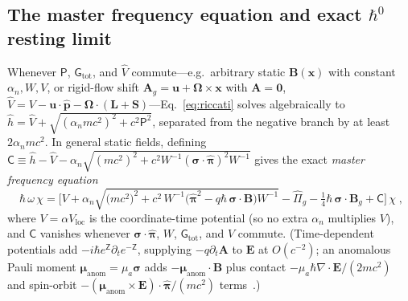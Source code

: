 \documentclass[aps,prd,onecolumn,tightenlines,nofootinbib,notitlepage,10pt,floatfix]{revtex4-2}
\theoremstyle{indentedtheorem}
\begin{document}
\subsection{The master frequency equation and exact \texorpdfstring{$\hbar^0$}{hbar0} resting limit}
\label{sec:master_equation_sub}

Whenever $\mathsf{P}$, $\mathsf{G}_\text{tot}$, and $\hat{V}$ commute---e.g.\ arbitrary static $\mathbf{B}(\mathbf{x})$ with constant $\alpha_n,W,V$, or rigid-flow shift $\mathbf{A}_g=\mathbf{u}+\boldsymbol{\Omega}\times\mathbf{x}$ with $\mathbf{A}=\mathbf{0}$, $\hat{V}=V-\mathbf{u}\cdot\hat{\mathbf{p}}-\boldsymbol{\Omega}\cdot(\mathbf{L}+\mathbf{S})$---Eq.~\eqref{eq:riccati} solves algebraically to $\hat{h}=\hat{V}+\sqrt{(\alpha_n mc^2)^2+c^2\mathsf{P}^2}$, separated from the negative branch by at least $2\alpha_n mc^2$. In general static fields, defining $\mathsf{C}\equiv\hat{h}-\hat{V}-\alpha_n\sqrt{(mc^2)^2+c^2 W^{-1}(\boldsymbol{\sigma}\cdot\hat{\boldsymbol{\pi}})^2 W^{-1}}$ gives the exact \emph{master frequency equation}
\begin{equation}
    \boxed{\;
    \hbar\,\omega\,\chi = \Big[V + \alpha_n\sqrt{\big(mc^2\big)^2 + c^2\,W^{-1}\big(\hat{\boldsymbol{\pi}}^2 - q\hbar\,\boldsymbol{\sigma}\cdot\mathbf{B}\big)W^{-1}} - \hat{\Pi}_g - \tfrac{1}{4}\hbar\,\boldsymbol{\sigma}\cdot\mathbf{B}_g + \mathsf{C}\Big]\,\chi\;} ,
    \label{eq:master}
\end{equation}
where $V=\alpha V_\text{loc}$ is the coordinate-time potential (so no extra $\alpha_n$ multiplies $V$), and $\mathsf{C}$ vanishes whenever $\boldsymbol{\sigma}\cdot\hat{\boldsymbol{\pi}}$, $W$, $\mathsf{G}_\text{tot}$, and $\hat{V}$ commute. (Time-dependent potentials add $-i\hbar e^{\mathsf{Z}}\partial_t e^{-\mathsf{Z}}$, supplying $-q\partial_t\mathbf{A}$ to $\mathbf{E}$ at $O(c^{-2})$; an anomalous Pauli moment $\boldsymbol{\mu}_\text{anom}=\mu_a\boldsymbol{\sigma}$ adds $-\boldsymbol{\mu}_\text{anom}\cdot\mathbf{B}$ plus contact $-\mu_a\hbar\nabla\cdot\mathbf{E}/(2mc^2)$ and spin-orbit $-(\boldsymbol{\mu}_\text{anom}\times\mathbf{E})\cdot\hat{\boldsymbol{\pi}}/(mc^2)$ terms~\citep{Schwinger1948Quantumelect,Foldy1952Electromagnetic,AharonovCasher1984Topological}.)
\end{document}
